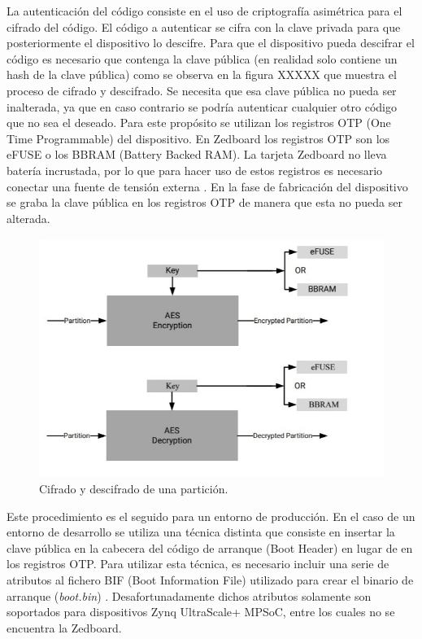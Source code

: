 La autenticación del código consiste en el uso de criptografía asimétrica para el cifrado del código. El código a autenticar se cifra con la clave privada para que posteriormente el dispositivo lo descifre. Para que el dispositivo pueda descifrar el código es necesario que contenga la clave pública (en realidad solo contiene un hash de la clave pública) como se observa en la figura XXXXX que muestra el proceso de cifrado y descifrado. Se necesita que esa clave pública no pueda ser inalterada, ya que en caso contrario se podría autenticar cualquier otro código que no sea el deseado. Para este propósito se utilizan los registros OTP (One Time Programmable) del dispositivo. En Zedboard los registros OTP son los eFUSE o los BBRAM (Battery Backed RAM). La tarjeta Zedboard no lleva batería incrustada, por lo que para hacer uso de estos registros es necesario conectar una fuente de tensión externa \cite{battery}. En la fase de fabricación del dispositivo se graba la clave pública en los registros OTP de manera que esta no pueda ser alterada. \newline 

\begin{figure}
	\centering
	\includegraphics[width=1\textwidth]{imagenes/autentication.jpg}
	\caption{\label{fig1}Cifrado y descifrado de una partición.}
\end{figure}


Este procedimiento es el seguido para un entorno de producción. En el caso de un entorno de desarrollo se utiliza una técnica distinta que consiste en insertar la clave pública en la cabecera del código de arranque (Boot Header) en lugar de en los registros OTP. Para utilizar esta técnica, es necesario incluir una serie de atributos al fichero BIF (Boot Information File) utilizado para crear el binario de arranque (\textit{boot.bin}) \cite{bootgen}. Desafortunadamente dichos atributos solamente son soportados para dispositivos Zynq UltraScale+ MPSoC, entre los cuales no se encuentra la Zedboard. \newline

